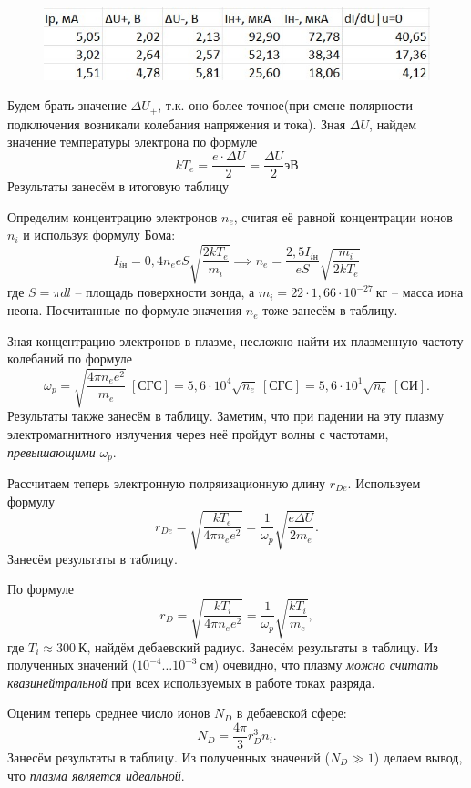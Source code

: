 \documentclass[a4paper,12pt]{article}
\begin{document}
\begin{figure}[H]
	\begin{center}
    		\includegraphics[width =.5\textwidth]{tabliza3.jpg}
    	\end{center}
\end{figure} 

Будем брать значение $\Delta U_+$, т.к. оно более точное(при смене полярности подключения возникали колебания напряжения и тока). Зная $\Delta U$, найдем значение температуры электрона по формуле
\[kT_e = \frac{e \cdot \Delta U}{2} = \frac{\Delta U}{2} \text{эВ}\]
Результаты занесём в итоговую таблицу

Определим концентрацию электронов $n_e$, считая её равной концентрации ионов $n_i$ и используя формулу Бома:\[I_{i\text{н}}=0,4n_eeS\sqrt{\frac{2kT_e}{m_i}}\implies n_e=\frac{2,5I_{i\text{н}}}{eS}\sqrt{\frac{m_i}{2kT_e}}\]где $S=\pi dl$ -- площадь поверхности зонда, а $m_i=22\cdot1,66\cdot10^{-27}~\text{кг}$ -- масса иона неона. Посчитанные по формуле значения $n_e$ тоже занесём в таблицу.

Зная концентрацию электронов в плазме, несложно найти их плазменную частоту колебаний по формуле\[\omega_p=\sqrt{\frac{4\pi n_ee^2}{m_e}}\ \left[\text{СГС}\right]=5,6\cdot10^4\sqrt{n_e}\ \left[\text{СГС}\right]=5,6\cdot10^1\sqrt{n_e}\ \left[\text{СИ}\right].\]Результаты также занесём в таблицу. Заметим, что при падении на эту плазму электромагнитного излучения через неё пройдут волны с частотами, \textit{превышающими} $\omega_p$.

Рассчитаем теперь электронную полряизационную длину $r_{De}$. Используем формулу\[r_{De}=\sqrt{\frac{kT_e}{4\pi n_ee^2}}=\frac{1}{\omega_p}\sqrt{\frac{e\Delta U}{2m_e}}.\]Занесём результаты в таблицу.

По формуле\[r_{D}=\sqrt{\frac{kT_i}{4\pi n_ee^2}}=\frac{1}{\omega_p}\sqrt{\frac{kT_i}{m_e}},\]где $T_i\approx300~\text{К}$, найдём дебаевский радиус. Занесём результаты в таблицу. Из полученных значений ($10^{-4}\ldots10^{-3}~\text{см}$) очевидно, что плазму \textit{можно считать квазинейтральной} при всех используемых в работе токах разряда.

Оценим теперь среднее число ионов $N_D$ в дебаевской сфере:\[N_D=\frac{4\pi}{3}r_D^3n_i.\]Занесём результаты в таблицу. Из полученных значений ($N_D\gg1$) делаем вывод, что \textit{плазма является идеальной}.
\end{document}
